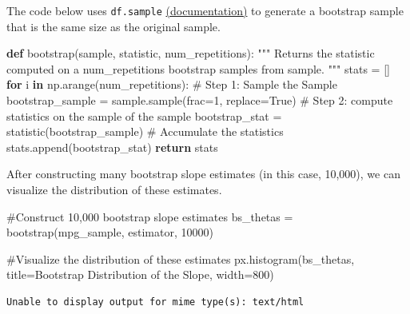 \documentclass[
  letterpaper,
  DIV=11,
  numbers=noendperiod]{scrreprt}
\newenvironment{Shaded}{\begin{snugshade}}{\end{snugshade}}
\newcommand{\CommentTok}[1]{\textcolor[rgb]{0.37,0.37,0.37}{#1}}
\newcommand{\ControlFlowTok}[1]{\textcolor[rgb]{0.00,0.23,0.31}{\textbf{#1}}}
\newcommand{\DecValTok}[1]{\textcolor[rgb]{0.68,0.00,0.00}{#1}}
\newcommand{\KeywordTok}[1]{\textcolor[rgb]{0.00,0.23,0.31}{\textbf{#1}}}
\newcommand{\NormalTok}[1]{\textcolor[rgb]{0.00,0.23,0.31}{#1}}
\newcommand{\OperatorTok}[1]{\textcolor[rgb]{0.37,0.37,0.37}{#1}}
\newcommand{\StringTok}[1]{\textcolor[rgb]{0.13,0.47,0.30}{#1}}
\newcommand{\VariableTok}[1]{\textcolor[rgb]{0.07,0.07,0.07}{#1}}
\begin{document}
The code below uses \texttt{df.sample}
\href{https://pandas.pydata.org/pandas-docs/stable/reference/api/pandas.DataFrame.sample.html}{(documentation)}
to generate a bootstrap sample that is the same size as the original
sample.

\begin{Shaded}
\begin{Highlighting}[]
\KeywordTok{def}\NormalTok{ bootstrap(sample, statistic, num\_repetitions):}
    \CommentTok{"""}
\CommentTok{    Returns the statistic computed on a num\_repetitions  }
\CommentTok{    bootstrap samples from sample.}
\CommentTok{    """}
\NormalTok{    stats }\OperatorTok{=}\NormalTok{ []}
    \ControlFlowTok{for}\NormalTok{ i }\KeywordTok{in}\NormalTok{ np.arange(num\_repetitions):}
        \CommentTok{\# Step 1: Sample the Sample}
\NormalTok{        bootstrap\_sample }\OperatorTok{=}\NormalTok{ sample.sample(frac}\OperatorTok{=}\DecValTok{1}\NormalTok{, replace}\OperatorTok{=}\VariableTok{True}\NormalTok{)}
        \CommentTok{\# Step 2: compute statistics on the sample of the sample}
\NormalTok{        bootstrap\_stat }\OperatorTok{=}\NormalTok{ statistic(bootstrap\_sample)}
        \CommentTok{\# Accumulate the statistics}
\NormalTok{        stats.append(bootstrap\_stat)}
    \ControlFlowTok{return}\NormalTok{ stats   }
\end{Highlighting}
\end{Shaded}

After constructing many bootstrap slope estimates (in this case,
10,000), we can visualize the distribution of these estimates.

\begin{Shaded}
\begin{Highlighting}[]
\CommentTok{\#Construct 10,000 bootstrap slope estimates}
\NormalTok{bs\_thetas }\OperatorTok{=}\NormalTok{ bootstrap(mpg\_sample, estimator, }\DecValTok{10000}\NormalTok{)}

\CommentTok{\#Visualize the distribution of these estimates}
\NormalTok{px.histogram(bs\_thetas, title}\OperatorTok{=}\StringTok{\textquotesingle{}Bootstrap Distribution of the Slope\textquotesingle{}}\NormalTok{, }
\NormalTok{             width}\OperatorTok{=}\DecValTok{800}\NormalTok{)}
\end{Highlighting}
\end{Shaded}

\begin{verbatim}
Unable to display output for mime type(s): text/html
\end{verbatim}
\end{document}
